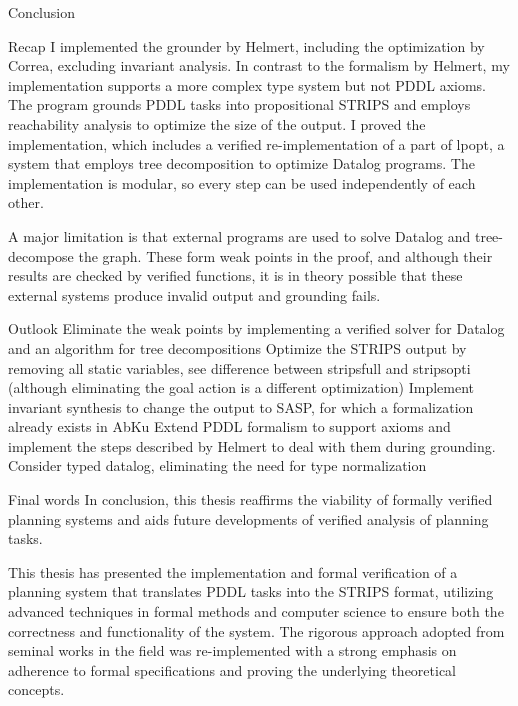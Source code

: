 
Conclusion

Recap
	I implemented the grounder by Helmert, including the optimization by Correa, excluding invariant analysis.
	In contrast to the formalism by Helmert, my implementation supports a more complex type system but not PDDL axioms.
	The program grounds PDDL tasks into propositional STRIPS and employs reachability analysis to optimize the size of the output.
	I proved the implementation, which includes a verified re-implementation of a part of lpopt, a system that employs tree decomposition to
	optimize Datalog programs. The implementation is modular, so every step can be used independently of each other.
	
	A major limitation is that external programs are used to solve Datalog and tree-decompose the graph.
	These form weak points in the proof, and although their results are checked by verified functions,
		it is in theory possible that these external systems produce invalid output and grounding fails.
	
	
Outlook
	Eliminate the weak points by implementing a verified solver for Datalog and an algorithm for tree decompositions	
	Optimize the STRIPS output by removing all static variables, see difference between stripsfull and stripsopti
		(although eliminating the goal action is a different optimization)
	Implement invariant synthesis to change the output to SASP, for which a formalization already exists in AbKu
	Extend PDDL formalism to support axioms and implement the steps described by Helmert to deal with them during grounding.
	Consider typed datalog, eliminating the need for type normalization
	

Final words
In conclusion, this thesis reaffirms the viability of formally verified planning systems and aids future developments of verified analysis of planning tasks.

	
	
This thesis has presented the implementation and formal verification of a planning system that translates PDDL tasks into the STRIPS format, utilizing advanced techniques in formal methods and computer science to ensure both the correctness and functionality of the system. The rigorous approach adopted from seminal works in the field was re-implemented with a strong emphasis on adherence to formal specifications and proving the underlying theoretical concepts.

